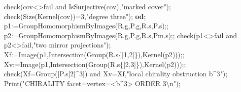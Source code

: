 \documentclass[
  10pt,
  letterpaper,
]{article}
\newenvironment{Shaded}{}{}
\newcommand{\BuiltInTok}[1]{\textcolor[rgb]{0.00,0.50,0.00}{#1}}
\newcommand{\ConstantTok}[1]{\textcolor[rgb]{0.53,0.00,0.00}{#1}}
\newcommand{\ControlFlowTok}[1]{\textcolor[rgb]{0.00,0.44,0.13}{\textbf{#1}}}
\newcommand{\FloatTok}[1]{\textcolor[rgb]{0.25,0.63,0.44}{#1}}
\newcommand{\NormalTok}[1]{#1}
\newcommand{\OperatorTok}[1]{\textcolor[rgb]{0.40,0.40,0.40}{#1}}
\newcommand{\StringTok}[1]{\textcolor[rgb]{0.25,0.44,0.63}{#1}}
\newcommand{\VariableTok}[1]{\textcolor[rgb]{0.10,0.09,0.49}{#1}}
\begin{document}
\begin{Shaded}
\begin{Highlighting}[]
 \VariableTok{check}\NormalTok{(}\VariableTok{cov}\OperatorTok{\textless{}\textgreater{}}\ConstantTok{fail} \ConstantTok{and} \BuiltInTok{IsSurjective}\NormalTok{(}\VariableTok{cov}\NormalTok{)}\OperatorTok{,}\StringTok{"marked cover"}\NormalTok{)}\OperatorTok{;}
 \VariableTok{check}\NormalTok{(}\BuiltInTok{Size}\NormalTok{(}\BuiltInTok{Kernel}\NormalTok{(}\VariableTok{cov}\NormalTok{))}\OperatorTok{=}\FloatTok{3}\OperatorTok{,}\StringTok{"degree three"}\NormalTok{)}\OperatorTok{;}
\ControlFlowTok{od}\OperatorTok{;}
\VariableTok{p1}\OperatorTok{:=}\BuiltInTok{GroupHomomorphismByImages}\NormalTok{(}\VariableTok{R}\NormalTok{.}\VariableTok{g}\OperatorTok{,}\VariableTok{P}\NormalTok{.}\VariableTok{g}\OperatorTok{,}\VariableTok{R}\NormalTok{.}\VariableTok{s}\OperatorTok{,}\VariableTok{P}\NormalTok{.}\VariableTok{s}\NormalTok{)}\OperatorTok{;;}
\VariableTok{p2}\OperatorTok{:=}\BuiltInTok{GroupHomomorphismByImages}\NormalTok{(}\VariableTok{R}\NormalTok{.}\VariableTok{g}\OperatorTok{,}\VariableTok{P}\NormalTok{.}\VariableTok{g}\OperatorTok{,}\VariableTok{R}\NormalTok{.}\VariableTok{s}\OperatorTok{,}\VariableTok{Pm}\NormalTok{.}\VariableTok{s}\NormalTok{)}\OperatorTok{;;}
\VariableTok{check}\NormalTok{(}\VariableTok{p1}\OperatorTok{\textless{}\textgreater{}}\ConstantTok{fail} \ConstantTok{and} \VariableTok{p2}\OperatorTok{\textless{}\textgreater{}}\ConstantTok{fail}\OperatorTok{,}\StringTok{"two mirror projections"}\NormalTok{)}\OperatorTok{;}
\VariableTok{Xf}\OperatorTok{:=}\BuiltInTok{Image}\NormalTok{(}\VariableTok{p1}\OperatorTok{,}\BuiltInTok{Intersection}\NormalTok{(}\BuiltInTok{Group}\NormalTok{(}\VariableTok{R}\NormalTok{.}\VariableTok{s}\NormalTok{\{[}\FloatTok{1}\OperatorTok{,}\FloatTok{2}\NormalTok{]\})}\OperatorTok{,}\BuiltInTok{Kernel}\NormalTok{(}\VariableTok{p2}\NormalTok{)))}\OperatorTok{;;}
\VariableTok{Xv}\OperatorTok{:=}\BuiltInTok{Image}\NormalTok{(}\VariableTok{p1}\OperatorTok{,}\BuiltInTok{Intersection}\NormalTok{(}\BuiltInTok{Group}\NormalTok{(}\VariableTok{R}\NormalTok{.}\VariableTok{s}\NormalTok{\{[}\FloatTok{2}\OperatorTok{,}\FloatTok{3}\NormalTok{]\})}\OperatorTok{,}\BuiltInTok{Kernel}\NormalTok{(}\VariableTok{p2}\NormalTok{)))}\OperatorTok{;;}
\VariableTok{check}\NormalTok{(}\VariableTok{Xf}\OperatorTok{=}\BuiltInTok{Group}\NormalTok{([}\VariableTok{P}\NormalTok{.}\VariableTok{s}\NormalTok{[}\FloatTok{2}\NormalTok{]}\OperatorTok{\^{}}\FloatTok{3}\NormalTok{]) }\ConstantTok{and} \VariableTok{Xv}\OperatorTok{=}\VariableTok{Xf}\OperatorTok{,}\StringTok{"local chirality obstruction b\^{}3"}\NormalTok{)}\OperatorTok{;}
\BuiltInTok{Print}\NormalTok{(}\StringTok{"CHIRALITY facet=vertex=\textless{}b\^{}3\textgreater{} ORDER 3\textbackslash{}n"}\NormalTok{)}\OperatorTok{;}

\end{Highlighting}
\end{Shaded}
\end{document}
